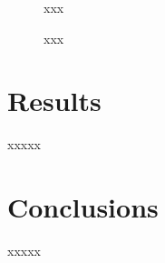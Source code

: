 \documentclass{aa}
\begin{document}
 \begin{figure}
  \caption{xxx}
  \label{fig:BER29_struct}
 \end{figure}


 \begin{figure}
  \caption{xxx}
  \label{fig:BER29_fpars}
 \end{figure}





\section{Results}
 \label{sec:results}

 xxxxx





\section{Conclusions}
 \label{sec:conclusions}

 xxxxx
\end{document}
